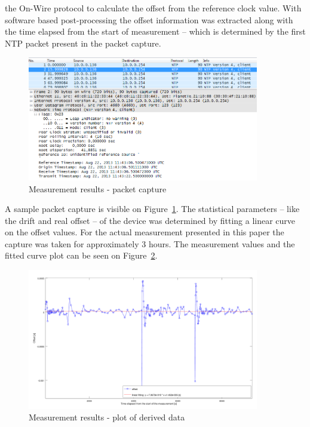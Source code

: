 \documentclass[journal]{IEEEtran}
\begin{document}
the On-Wire protocol to calculate the offset from the reference clock value. With software based post-processing the
offset information was extracted along with the time elapsed from the start of measurement -- which is determined by
the
first NTP packet present in the packet capture.

\begin{figure}[!htb]
    \centering
    \includegraphics[width=0.9\textwidth]{figures_raw/pcap-NTP.png}
    \caption{Measurement results - packet capture}
    \label{fig:pcap-NTP}
\end{figure}

A sample packet capture is visible on Figure~\ref{fig:pcap-NTP}. The statistical parameters -- like the drift and real
offset -- of the device was determined by
fitting a linear curve on the offset values. For the actual measurement presented in this paper the capture was taken
for approximately 3 hours.
The measurement values and the fitted curve plot can be seen on Figure~\ref{fig:results}.

\begin{figure}[!htb]
    \centering
    \includegraphics[width=0.9\textwidth]{figures_raw/plot2.png}
    \caption{Measurement results - plot of derived data}
    \label{fig:results}
\end{figure}
\end{document}

